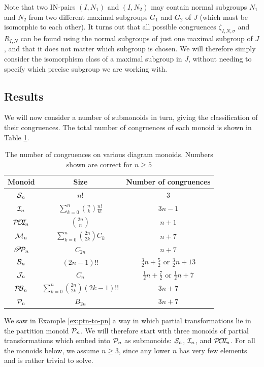 Note that two IN-pairs $(I, N_1)$ and $(I, N_2)$ may contain normal subgroups
$N_1$ and $N_2$ from two different maximal subgroups $G_1$ and $G_2$ of $J$
(which must be isomorphic to each other).  It turns out that all possible
congruences $\zeta_{I,N,\sigma}$ and $R_{I,N}$ can be found using the normal
subgroups of just one maximal subgroup of $J$, and that it does not matter which
subgroup is chosen.  We will therefore simply consider the isomorphism class of
a maximal subgroup in $J$, without needing to specify which precise subgroup we
are working with.

\subsection{Results}
\label{sec:other-monoids-results}
We will now consider a number of submonoids in turn, giving the classification
of their congruences.  The total number of congruences of each monoid is shown
in Table \ref{tab:other-monoids}.

\begin{table}[ht]
  \centering
  \renewcommand\arraystretch{1.5}
  \begin{tabular}{| c | c | c |}
    \hline
    Monoid & Size & Number of congruences \\
    \hline
    $\mathcal{S}_n$ & $n!$ & $3$ \\
    $\mathcal{I}_n$ & $\sum_{k=0}^n \binom{n}{k} \frac{n!}{k!}$ & $3n - 1$ \\
    $\mathcal{P\!O\!I\!}_n$ & $\binom{2n}{n}$ & $n + 1$ \\
    $\mathcal{M}_n$ & $\sum_{k=0}^n \binom{2n}{2k}C_k$ & $n + 7$ \\
    $\mathscr{P}\!\mathcal{P}_n$ & $C_{2n}$ & $n + 7$ \\
    $\mathcal{B}_n$ & $(2n - 1)!!$ & $\frac{3}{2}n + \frac{5}{2}$ or $\frac{3}{2}n + 13$ \\
    $\mathcal{J}_n$ & $C_n$ & $\frac{1}{2}n + \frac{7}{2}$ or $\frac{1}{2}n + 7$ \\
    $\mathcal{P\!B}_n$ & $\sum_{k=0}^n \binom{2n}{2k} (2k-1)!!$ & $3n + 7$ \\
    $\mathcal{P}_n$ & $B_{2n}$ & $3n + 7$ \\
    \hline
  \end{tabular}
  \caption[The number of congruences on various diagram monoids]{The number of
    congruences on various diagram monoids.  Numbers shown are correct for
    $n \geq 5$}
  \label{tab:other-monoids}
\end{table}

We saw in Example \ref{ex:ptn-to-pn} a way in which partial transformations lie
in the partition monoid $\mathcal{P}_n$.  We will therefore start with three monoids of
partial transformations which embed into $\mathcal{P}_n$ as submonoids: $\mathcal{S}_n$,
$\mathcal{I}_n$, and $\mathcal{P\!O\!I\!}_n$.  For all the monoids below, we assume $n \geq 3$, since any
lower $n$ has very few elements and is rather trivial to solve.

